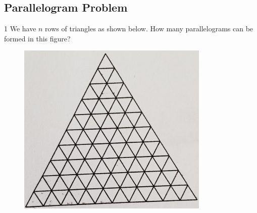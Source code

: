 \subsection{Parallelogram Problem}
\begin{problem}
	1 We have $n$ rows of triangles as shown below. How many parallelograms can be formed in this figure?
\end{problem}
\begin{figure}
\includegraphics[scale=1]{figures/TRIANGLE22.png}
\centering
\end{figure}
